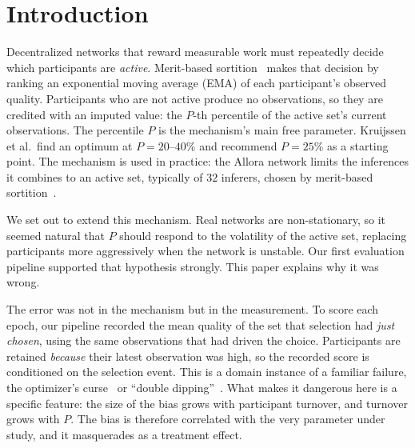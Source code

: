 \documentclass[sigconf,anonymous,review,nonacm]{acmart}
\begin{document}
\section{Introduction}

Decentralized networks that reward measurable work must repeatedly decide which
participants are \emph{active}. Merit-based sortition~\cite{kruijssen2024} makes that
decision by ranking an exponential moving average (EMA) of each participant's observed
quality. Participants who are not active produce no observations, so they are credited
with an imputed value: the $P$-th percentile of the active set's current observations. The
percentile $P$ is the mechanism's main free parameter. Kruijssen et al.\ find an optimum
at $P=20$--$40\%$ and recommend $P=25\%$ as a starting point. The mechanism is used in
practice: the Allora network limits the inferences it combines to an active set, typically
of $32$ inferers, chosen by merit-based sortition~\cite{pfeffer2025context}.

We set out to extend this mechanism. Real networks are non-stationary, so it seemed
natural that $P$ should respond to the volatility of the active set, replacing participants
more aggressively when the network is unstable. Our first evaluation pipeline supported
that hypothesis strongly. This paper explains why it was wrong.

The error was not in the mechanism but in the measurement. To score each epoch, our
pipeline recorded the mean quality of the set that selection had \emph{just chosen}, using
the same observations that had driven the choice. Participants are retained \emph{because}
their latest observation was high, so the recorded score is conditioned on the selection
event. This is a domain instance of a familiar failure, the optimizer's
curse~\cite{smith2006optimizer} or ``double dipping''~\cite{kriegeskorte2009circular}.
What makes it dangerous here is a specific feature: the size of the bias grows with
participant turnover, and turnover grows with $P$. The bias is therefore correlated with
the very parameter under study, and it masquerades as a treatment effect.
\end{document}
